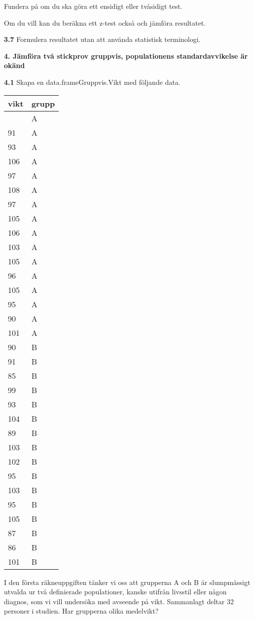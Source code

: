 \documentclass[
  letterpaper,
  DIV=11,
  numbers=noendperiod]{scrartcl}
\begin{document}
Fundera på om du ska göra ett ensidigt eller tvåsidigt test.

Om du vill kan du beräkna ett z-test också och jämföra resultatet.

\textbf{3.7} Formulera resultatet utan att använda statistisk
terminologi.

\textbf{4. Jämföra två stickprov gruppvis, populationens
standardavvikelse är okänd}

\textbf{4.1} Skapa en data.frameGruppvis.Vikt med följande data.

\begin{longtable}[]{@{}ll@{}}
\toprule\noalign{}
vikt & grupp \\
\midrule\noalign{}
\endhead
\bottomrule\noalign{}
\endlastfoot
90 & A \\
91 & A \\
93 & A \\
106 & A \\
97 & A \\
108 & A \\
97 & A \\
105 & A \\
106 & A \\
103 & A \\
105 & A \\
96 & A \\
105 & A \\
95 & A \\
90 & A \\
101 & A \\
90 & B \\
91 & B \\
85 & B \\
99 & B \\
93 & B \\
104 & B \\
89 & B \\
103 & B \\
102 & B \\
95 & B \\
103 & B \\
95 & B \\
105 & B \\
87 & B \\
86 & B \\
101 & B \\
\end{longtable}

I den första räkneuppgiften tänker vi oss att grupperna A och B är
slumpmässigt utvalda ur två definierade populationer, kanske utifrån
livsstil eller någon diagnos, som vi vill undersöka med avseende på
vikt. Sammanlagt deltar 32 personer i studien. Har grupperna olika
medelvikt?
\end{document}
